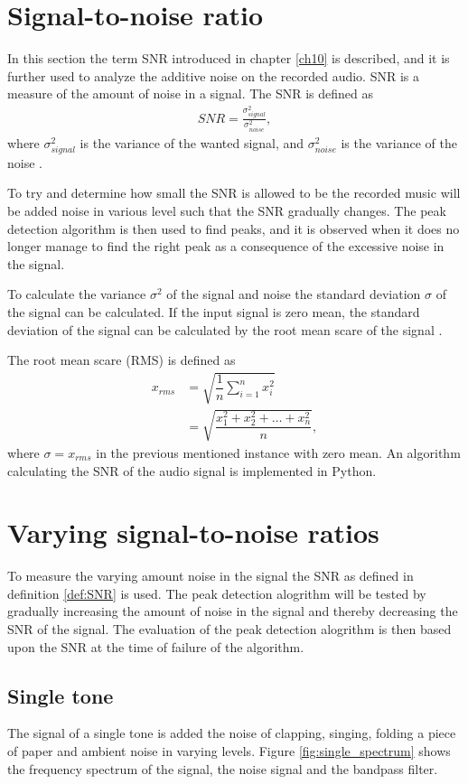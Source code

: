 \section{Signal-to-noise ratio}
In this section the term SNR introduced in chapter \ref{ch10} is described, and it is further used to analyze the additive noise on the recorded audio.
SNR is a measure of the amount of noise in a signal. 
The SNR is defined as
\begin{align} \label{eq:SNR}
	SNR=\frac{\sigma_{signal}^2}{\sigma_{noise}^2},
\end{align}
where $\sigma_{signal}^2$ is the variance of the wanted signal, and $\sigma_{noise}^2$ is the variance of the noise \cite{page 228, DTSP}.

To try and determine how small the SNR is allowed to be the recorded music will be added noise in various level such that the SNR gradually changes.
The peak detection algorithm is then used to find peaks, and it is observed when it does no longer manage to find the right peak as a consequence of the excessive noise in the signal.

To calculate the variance $\sigma^2$ of the signal and noise the standard deviation $\sigma$ of the signal can be calculated. 
If the input signal is zero mean, the standard deviation of the signal can be calculated by the root mean scare of the signal \cite{page 228, DTSP}.

The root mean scare (RMS) is defined as
\begin{align*}
	x_{rms} 
	&=\sqrt{\dfrac{1}{n} \sum_{i=1}^n x_i^2}\\
	&= \sqrt{\dfrac{x_1^2 + x_2^2 + \dots + x_n^2}{n}},
\end{align*}
where $\sigma = x_{rms}$ in the previous mentioned instance with zero mean. An algorithm calculating the SNR of the audio signal is implemented in Python.

\section{Varying signal-to-noise ratios}
To measure the varying amount noise in the signal the SNR as defined in definition \ref{def:SNR} is used. The peak detection alogrithm will be tested by gradually increasing the amount of noise in the signal and thereby decreasing the SNR of the signal. The evaluation of the peak detection alogrithm is then based upon the SNR at the time of failure of the algorithm.

\subsection{Single tone}
The signal of a single tone is added the noise of clapping, singing, folding a piece of paper and ambient noise in varying levels. Figure \ref{fig:single_spectrum} shows the frequency spectrum of the signal, the noise signal and the bandpass filter.

